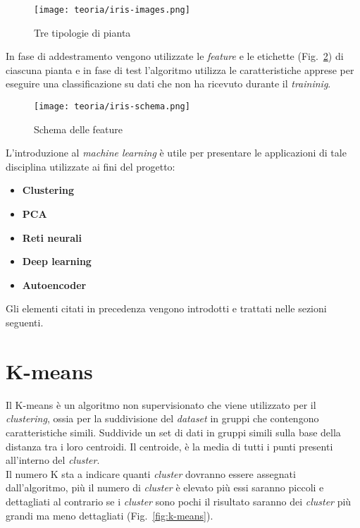\begin{figure}[!h] 
    \centering 
    \texttt{[image: teoria/iris-images.png]} 
    \caption{Tre tipologie di pianta}
    \label{fig:iris-images}
  \end{figure}
In fase di addestramento vengono utilizzate le \emph{feature} e le etichette (Fig.~\ref{fig:iris-schema}) di ciascuna pianta e in fase di test l'algoritmo utilizza le caratteristiche apprese per eseguire una classificazione su dati che non ha ricevuto durante il \emph{traininig}.

\begin{figure}[!h] 
    \centering 
    \texttt{[image: teoria/iris-schema.png]} 
    \caption{Schema delle feature}
    \label{fig:iris-schema}
  \end{figure}
L'introduzione al \emph{machine learning} è utile per presentare le applicazioni di tale disciplina utilizzate ai fini del progetto:
\begin{itemize}
    \item \textbf{Clustering}
    \item \textbf{PCA}
    \item \textbf{Reti neurali}
    \item \textbf{Deep learning}
    \item \textbf{Autoencoder}
\end{itemize}
Gli elementi citati in precedenza vengono introdotti e trattati nelle sezioni seguenti.

\newpage

\section{K-means}
Il K-means è un algoritmo non supervisionato che viene utilizzato per il \emph{clustering}, ossia per la suddivisione del \emph{dataset} in gruppi che contengono caratteristiche simili.
Suddivide un set di dati in gruppi simili sulla base della distanza tra i loro centroidi. 
Il centroide, è la media di tutti i punti presenti all'interno del \emph{cluster}.\\Il numero K sta a indicare quanti \emph{cluster} dovranno essere assegnati dall'algoritmo, più il numero di \emph{cluster} è elevato più essi saranno piccoli e dettagliati al contrario se i \emph{cluster} sono pochi il risultato saranno dei \emph{cluster} più grandi ma meno dettagliati (Fig.~\ref{fig:k-means}).

